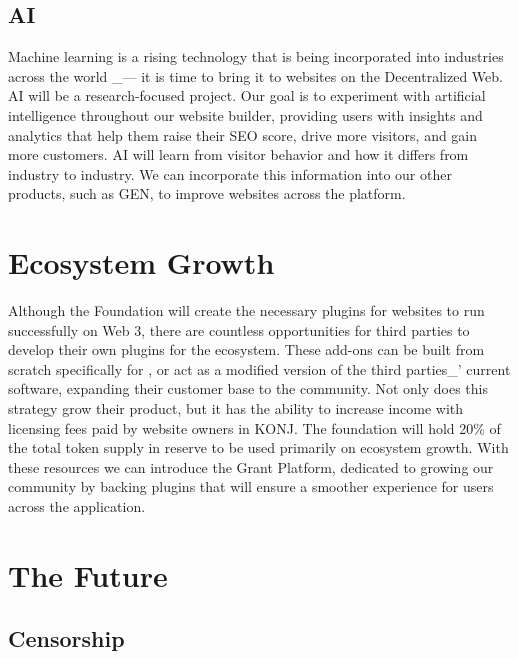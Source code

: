 \documentclass{kwp-builder}
\begin{document}
\newpage

\subsection{\konjure AI}

\tab Machine learning is a rising technology that is being incorporated into industries across the world \_{—} it is time to bring it to websites on the Decentralized Web. \konjure AI will be a research-focused project. Our goal is to experiment with artificial intelligence throughout our website builder, providing users with insights and analytics that help them raise their SEO score, drive more visitors, and gain more customers. \konjure AI will learn from visitor behavior and how it differs from industry to industry. We can incorporate this information into our other products, such as \konjure GEN, to improve websites across the platform.


\section{Ecosystem Growth}

\tab Although the \konjure Foundation will create the necessary plugins for websites to run successfully on Web 3, there are countless opportunities for third parties to develop their own plugins for the ecosystem. These add-ons can be built from scratch specifically for \konjure, or act as a modified version of the third parties\_{’} current software, expanding their customer base to the \konjure community. Not only does this strategy grow their product, but it has the ability to increase income with licensing fees paid by website owners in KONJ. The foundation will hold 20\% of the total token supply in reserve to be used primarily on ecosystem growth. With these resources we can introduce the \konjure Grant Platform, dedicated to growing our community by backing plugins that will ensure a smoother experience for users across the application.


\newpage

\section{The Future}
\subsection{Censorship}
\end{document}
